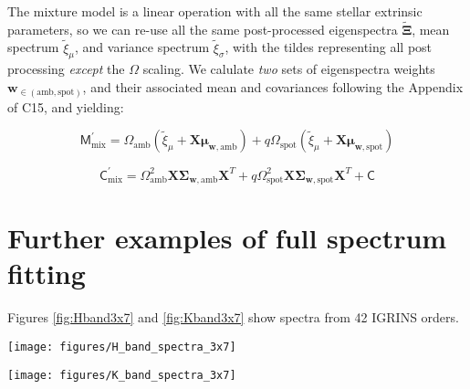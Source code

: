 \documentclass[twocolumn]{emulateapj}%
\newcommand{\iancze}{{\sc C15}}
\begin{document}
The mixture model is a linear operation with all the same stellar extrinsic parameters, so we can re-use all the same post-processed eigenspectra $\widetilde{\mathbf{\Xi}}$, mean spectrum $\widetilde{\xi}_\mu$, and variance spectrum $\widetilde{\xi}_\sigma$, with the tildes representing all post processing \emph{except} the $\Omega$ scaling.  We calulate \emph{two} sets of eigenspectra weights $\mathbf{w}_{\in (\mathrm{amb}, \mathrm{spot})}$, and their associated mean and covariances following the Appendix of \iancze, and yielding:

\begin{equation}
  \mathsf{M}_{\mathrm{mix}}^\prime = \Omega_{\mathrm{amb}} (\widetilde{\xi}_\mu + \mathbf{X} \mathbf{\mu}_{\mathbf{w}, \mathrm{amb}}) + q \Omega_{\mathrm{spot}} (\widetilde{\xi}_\mu + \mathbf{X} \mathbf{\mu}_{\mathbf{w}, \mathrm{spot}})
\end{equation}

\begin{equation}
  \mathsf{C}_{\mathrm{mix}}^\prime = \Omega_{\mathrm{amb}}^2 \mathbf{X} \mathbf{\Sigma}_\mathbf{w, \mathrm{amb}} \mathbf{X}^T + q \Omega_{\mathrm{spot}}^2 \mathbf{X} \mathbf{\Sigma}_\mathbf{w, \mathrm{spot}} \mathbf{X}^T + \mathsf{C}
  \label{eqn:modC}
\end{equation}



\section{Further examples of full spectrum fitting}

Figures \ref{fig:Hband3x7} and \ref{fig:Kband3x7} show spectra from 42 IGRINS orders.


\begin{figure*}
 \centering
 \texttt{[image: figures/H\_band\_spectra\_3x7]}
 \caption{IGRINS Orders $122-100$, with panels arranged with the shortest wavelength in the upper left corner with central wavelenth decreasing toward the bottom of the leftmost column, then decreasing through the subsequent columns.  The $y-$axis is on a logarithmic scale.  The red line is the cool photosphere while the blue line is the hot photosphere.  The purple line is the composite mixture model.}
 \label{fig:Hband3x7}
\end{figure*}

\begin{figure*}
 \centering
 \texttt{[image: figures/K\_band\_spectra\_3x7]}
 \caption{IGRINS Orders $93-73$, with the same layout, ordering, and colors as Figure \ref{fig:Hband3x7}. The $y-$axis is on a logarithmic scale.}
 \label{fig:Kband3x7}
\end{figure*}
\end{document}

